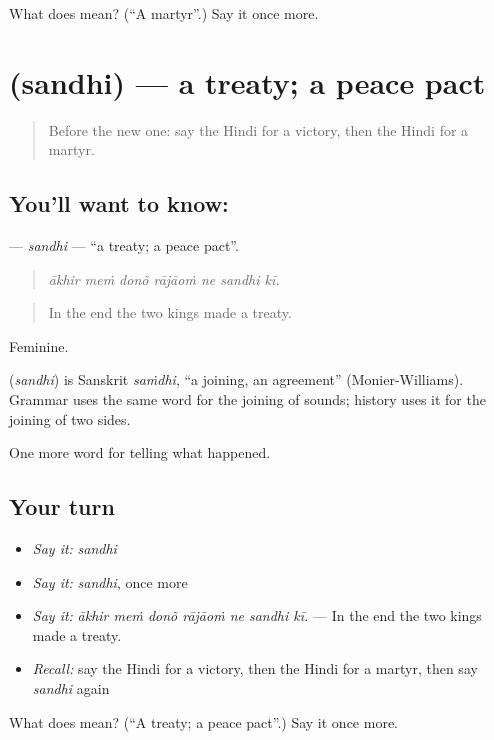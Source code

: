 \begin{tcolorbox}[breakable,colback=teal!4,colframe=teal!35!black,title={Before you move on}]
What does  mean? (\textquotedblleft{}A martyr\textquotedblright{}.) Say it once more.
\end{tcolorbox}
\section[\texorpdfstring{\hi{संधि} (sandhi)}{संधि (sandhi)}]{ (sandhi) — a treaty; a peace pact}

\label{lesson:HI-C323-sandhi}



\begin{quote}
Before the new one: say the Hindi for a victory, then the Hindi for a martyr.
\end{quote}

\subsection*{You'll want to know: }
\textbf{} — \emph{sandhi} — \textquotedblleft{}a treaty; a peace pact\textquotedblright{}.

\begin{quote}
      
\end{quote}

\begin{quote}
\emph{ākhir meṁ donõ rājāoṁ ne sandhi kī.}
\end{quote}

\begin{quote}
In the end the two kings made a treaty.
\end{quote}

Feminine.

\begin{cousinweb}
\textbf{} (\emph{sandhi}) is Sanskrit \emph{saṁdhi}, \textquotedblleft{}a joining, an agreement\textquotedblright{} (Monier-Williams). Grammar uses the same word for the joining of sounds; history uses it for the joining of two sides.
\end{cousinweb}

\begin{grammarlens}[title={What you've built}]
One more word for telling what happened.
\end{grammarlens}

\subsection*{Your turn}
\begin{itemize}
\raggedright
  \item \emph{Say it:} \emph{sandhi}
  \item \emph{Say it:} \emph{sandhi}, once more
  \item \emph{Say it:} \emph{ākhir meṁ donõ rājāoṁ ne sandhi kī.} — In the end the two kings made a treaty.
  \item \emph{Recall:} say the Hindi for a victory, then the Hindi for a martyr, then say \emph{sandhi} again
\end{itemize}

\begin{tcolorbox}[breakable,colback=teal!4,colframe=teal!35!black,title={Before you move on}]
What does  mean? (\textquotedblleft{}A treaty; a peace pact\textquotedblright{}.) Say it once more.
\end{tcolorbox}
